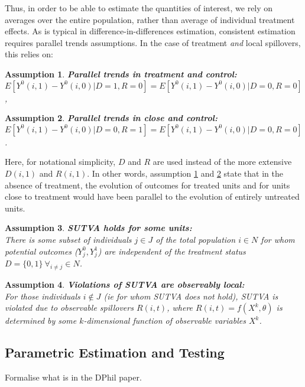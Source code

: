 \documentclass{article}
\newtheorem{assumption}{Assumption}
\begin{document}
\begin{spacing}{1.1}
Thus, in order to be able to estimate the quantities of interest, we rely on
averages over the entire population, rather than average of individual 
treatment effects.  As is typical in difference-in-differences estimation,
consistent estimation requires parallel trends assumptions.  In the case of
treatment \emph{and} local spillovers, this relies on:

\begin{assumption}
\label{Sass:PT}
\textbf{Parallel trends in treatment and control:} \\
$E[Y^0(i,1)-Y^0(i,0)|D=1,R=0]=E[Y^0(i,1)-Y^0(i,0)|D=0,R=0]$,
\end{assumption}
\begin{assumption}
\label{Sass:PTC}
\textbf{Parallel trends in close and control:} \\
$E[Y^0(i,1)-Y^0(i,0)|D=0,R=1]=E[Y^0(i,1)-Y^0(i,0)|D=0,R=0]$.
\end{assumption}

Here, for notational simplicity, $D$ and $R$ are used instead of the more 
extensive $D(i,1)$ and $R(i,1)$.  In other words, assumption \ref{Sass:PT}
and \ref{Sass:PTC} state that in the absence of treatment, the evolution
of outcomes for treated units and for units close to treatment would have
been parallel to the evolution of entirely untreated units.


\begin{assumption}
\textbf{SUTVA holds for some units:} \\
There is some subset of individuals $j\in J$ of the total population $i\in N$ 
for whom potential outcomes ($Y_j^0, Y_j^1$) are independent of the treatment 
status $D=\{0,1\}\ \forall_{i\neq j} \in N$.
\end{assumption}

\begin{assumption}
\textbf{Violations of SUTVA are observably local:} \\ 
For those individuals $i\notin J$ (ie for whom SUTVA does not hold), SUTVA is
violated due to observable spillovers $R(i,t)$, where $R(i,t)=f(X^k,\theta)$
is determined by some $k$-dimensional function of observable variables $X^k$.
\end{assumption}


\subsection{Parametric Estimation and Testing}
Formalise what is in the DPhil paper.


\end{spacing}
\end{document}

